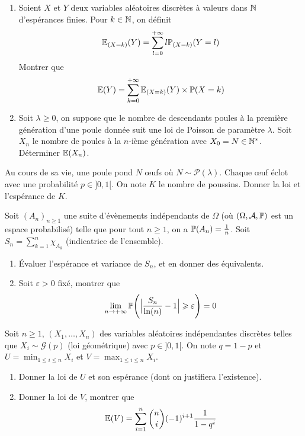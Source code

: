 \documentclass[12pt]{article}
\begin{document}
\begin{exercise}
	\phantom{}
	\begin{enumerate}
		\item
		Soient $X$ et $Y$ deux variables aléatoires discrètes à valeurs dans $\N$
		d'espérances finies. Pour $k\in\N$, on définit
		$$\E_{(X=k)}(Y)=\sum_{l=0}^{+\infty}l\P_{(X=k)}(Y=l)$$ Montrer que
		$$\E(Y)=\sum_{k=0}^{+\infty}\E_{(X=k)}(Y)\times\P(X=k)$$
		\item
		Soit $\lambda\geqslant0$, on suppose que le nombre de descendants poules à
		la première génération d'une poule donnée suit une loi de Poisson de
		paramètre $\lambda$. Soit $X_{n}$ le nombre de poules à la $n$-ième
		génération avec $X_{0}=N\in\N^{*}$. Déterminer $\E(X_{n})$.
	\end{enumerate}
\end{exercise}

\begin{exercise}
	Au cours de sa vie, une poule pond $N$ \oe ufs où $N\sim\mathcal{P}(\lambda)$.
	Chaque \oe uf éclot avec une probabilité $p\in]0,1[$. On note $K$ le nombre de
	poussins. Donner la loi et l'espérance de $K$.
\end{exercise}

\begin{exercise}
	Soit $(A_{n})_{n\geqslant1}$ une suite d'évènements indépendants de $\Omega$
	(où $(\Omega,\mathcal{A},\P)$ est un espace probabilisé) telle que pour tout
	$n\geqslant1$, on a $\P(A_{n})=\frac{1}{n}$. Soit
	$S_{n}=\sum_{k=1}^{n}\chi_{A_{k}}$ (indicatrice de l'ensemble).
	\begin{enumerate}
		\item
		Évaluer l'espérance et variance de $S_{n}$, et en donner des équivalents.
		\item
		Soit $\varepsilon>0$ fixé, montrer que 
		$$\lim\limits_{n\to+\infty}\P\Biggl(\Bigl\vert\frac{S_{n}}{\ln(n)}-1\Bigr\vert\geqslant\varepsilon\Biggr)=0$$
	\end{enumerate}
\end{exercise}

\begin{exercise}
	Soit $n\geqslant1$, $(X_{1},\dots,X_{n})$ des variables aléatoires
	indépendantes discrètes telles que $X_{i}\sim\mathcal{G}(p)$ (loi géométrique)
	avec $p\in]0,1[$. On note $q=1-p$ et $U=\min_{1\leqslant i\leqslant n}X_{i}$
	et $V=\max_{1\leqslant i\leqslant n}X_{i}$.
	\begin{enumerate}
		\item
		Donner la loi de $U$ et son espérance (dont on justifiera l'existence).
		\item
		Donner la loi de $V$, montrer que
		$$\E(V)=\sum_{i=1}^{n}\binom{n}{i}(-1)^{i+1}\frac{1}{1-q^{i}}$$
	\end{enumerate}
\end{exercise}
\end{document}
